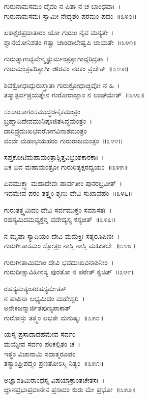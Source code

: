 ಗುರುನಾಮಸಮಂ ದೈವಂ ನ ಪಿತಾ ನ ಚ ಬಾಂಧವಾಃ~।\\
ಗುರುನಾಮಸಮಃ ಸ್ವಾಮೀ ನೇದೃಶಂ ಪರಮಂ ಪದಂ~॥೩೪೦॥

ಏಕಾಕ್ಷರಪ್ರದಾತಾರಂ ಯೋ ಗುರುಂ ನೈವ ಮನ್ಯತೇ~।\\
ಶ್ವಾನಯೋನಿಶತಂ ಗತ್ವಾ ಚಾಂಡಾಲೇಷ್ವಪಿ ಜಾಯತೇ~॥೩೪೧॥

ಗುರುತ್ಯಾಗಾದ್ಭವೇನ್ಮೃತ್ಯುರ್ಮಂತ್ರತ್ಯಾಗಾದ್ದರಿದ್ರತಾ~।\\
ಗುರುಮಂತ್ರಪರಿತ್ಯಾಗೀ ರೌರವಂ ನರಕಂ ವ್ರಜೇತ್~॥೩೪೨॥

ಶಿವಕ್ರೋಧಾದ್ಗುರುಸ್ತ್ರಾತಾ ಗುರುಕ್ರೋಧಾಚ್ಛಿವೋ ನ ಹಿ~।\\
ತಸ್ಮಾತ್ಸರ್ವಪ್ರಯತ್ನೇನ ಗುರೋರಾಜ್ಞಾಂ ನ ಲಂಘಯೇತ್~॥೩೪೩॥

ಸಂಸಾರಸಾಗರಸಮುದ್ಧರಣೈಕಮಂತ್ರಂ \\ಬ್ರಹ್ಮಾದಿದೇವಮುನಿಪೂಜಿತಸಿದ್ಧಮಂತ್ರಂ~।\\
ದಾರಿದ್ರ್ಯದುಃಖಭವರೋಗವಿನಾಶಮಂತ್ರಂ \\ವಂದೇ ಮಹಾಭಯಹರಂ ಗುರುರಾಜಮಂತ್ರಂ~॥೩೪೪॥

ಸಪ್ತಕೋಟಿಮಹಾಮಂತ್ರಾಶ್ಚಿತ್ತವಿಭ್ರಂಶಕಾರಕಾಃ~।\\
ಏಕ ಏವ ಮಹಾಮಂತ್ರೋ ಗುರುರಿತ್ಯಕ್ಷರದ್ವಯಂ~॥೩೪೫॥

ಏವಮುಕ್ತ್ವಾ ಮಹಾದೇವಃ ಪಾರ್ವತೀಂ ಪುನರಬ್ರವೀತ್~।\\
ಇದಮೇವ ಪರಂ ತತ್ತ್ವಂ ಶೃಣು ದೇವಿ ಸುಖಾವಹಂ~॥೩೪೬॥

ಗುರುತತ್ತ್ವಮಿದಂ ದೇವಿ ಸರ್ವಮುಕ್ತಂ ಸಮಾಸತಃ~।\\
ರಹಸ್ಯಮಿದಮವ್ಯಕ್ತನ್ನ ವದೇದ್ಯಸ್ಯ ಕಸ್ಯಚಿತ್~॥೩೪೭॥

ನ ಮೃಷಾ ಸ್ಯಾದಿಯಂ ದೇವಿ ಮದುಕ್ತಿಃ ಸತ್ಯರೂಪಿಣೀ~।\\
ಗುರುಗೀತಾಸಮಂ ಸ್ತೋತ್ರಂ ನಾಸ್ತಿ ನಾಸ್ತಿ ಮಹೀತಲೇ~॥೩೪೮॥

ಗುರುಗೀತಾಮಿಮಾಂ ದೇವಿ ಭವದುಃಖವಿನಾಶಿನೀಂ~।\\
ಗುರುದೀಕ್ಷಾವಿಹೀನಸ್ಯ ಪುರತೋ ನ ಪಠೇತ್ ಕ್ವಚಿತ್~॥೩೪೯॥

ರಹಸ್ಯಮತ್ಯಂತರಹಸ್ಯಮೇತತ್ \\ನ ಪಾಪಿನಾ ಲಭ್ಯಮಿದಂ ಮಹೇಶ್ವರಿ~।\\
ಅನೇಕಜನ್ಮಾರ್ಜಿತಪುಣ್ಯಪಾಕಾತ್ \\ಗುರೋಸ್ತು ತತ್ತ್ವಂ ಲಭತೇ ಮನುಷ್ಯಃ~॥೩೫೦॥

ಯಸ್ಯ ಪ್ರಸಾದಾದಹಮೇವ ಸರ್ವಂ\\ ಮಯ್ಯೇವ ಸರ್ವಂ ಪರಿಕಲ್ಪಿತಂ ಚ~।\\
ಇತ್ಥಂ ವಿಜಾನಾಮಿ ಸದಾತ್ಮರೂಪಂ \\ತಸ್ಯಾಂಘ್ರಿಪದ್ಮಂ ಪ್ರಣತೋಽಸ್ಮಿ ನಿತ್ಯಂ~॥೩೫೧॥

ಅಜ್ಞಾನತಿಮಿರಾಂಧಸ್ಯ ವಿಷಯಾಕ್ರಾಂತಚೇತಸಃ~।\\
ಜ್ಞಾನಪ್ರಭಾಪ್ರದಾನೇನ ಪ್ರಸಾದಂ ಕುರು ಮೇ ಪ್ರಭೋ~॥೩೫೨॥

